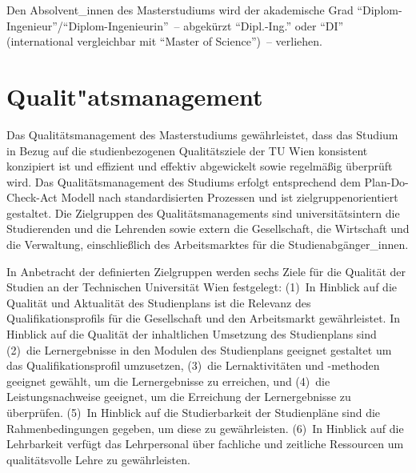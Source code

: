 Den Absolvent\_innen 
des Masterstudiums \emph{} wird der akademische Grad
"`Diplom-Ingenieur"'/"`Diplom-Ingenieurin"'~-- abgekürzt
"`Dipl.-Ing."' oder "`DI"' (international vergleichbar mit 
"`Master of Science"')~-- verliehen.

\section{Qualit"atsmanagement}\label{sec:IQ}

Das Qualitätsmanagement des Masterstudiums \emph{}
gewährleistet, dass das Studium in Bezug auf die studienbezogenen
Qualitätsziele der TU Wien konsistent konzipiert ist und effizient und
effektiv abgewickelt sowie regelmäßig überprüft wird. Das
Qualitätsmanagement des Studiums erfolgt entsprechend dem
Plan-Do-Check-Act Modell nach standardisierten Prozessen und ist
zielgruppenorientiert gestaltet. Die Zielgruppen des
Qualitätsmanagements sind universitätsintern die Studierenden und die
Lehrenden sowie extern die Gesellschaft, die Wirtschaft und die
Verwaltung, einschließlich des Arbeitsmarktes für die
Studienabgänger\_innen. 
\medskip

In Anbetracht der definierten Zielgruppen werden sechs Ziele für die
Qualität der Studien an der Technischen Universität Wien festgelegt:
(1)~In Hinblick auf die Qualität und Aktualität des
Studienplans ist die Relevanz des Qualifikationsprofils für die
Gesellschaft und den Arbeitsmarkt gewährleistet. In Hinblick auf die
Qualität der inhaltlichen Umsetzung des Studienplans sind (2)~die
Lernergebnisse in den Modulen des Studienplans geeignet gestaltet um
das Qualifikationsprofil umzusetzen, (3)~die Lernaktivitäten und
-methoden geeignet gewählt, um die Lernergebnisse zu erreichen, und
(4)~die Leistungsnachweise geeignet, um die Erreichung der
Lernergebnisse zu überprüfen.  (5)~In Hinblick auf die Studierbarkeit
der Studienpläne sind die Rahmenbedingungen gegeben, um diese zu
gewährleisten.  (6)~In Hinblick auf die Lehrbarkeit verfügt das
Lehrpersonal über fachliche und zeitliche Ressourcen um qualitätsvolle
Lehre zu gewährleisten.
\medskip

